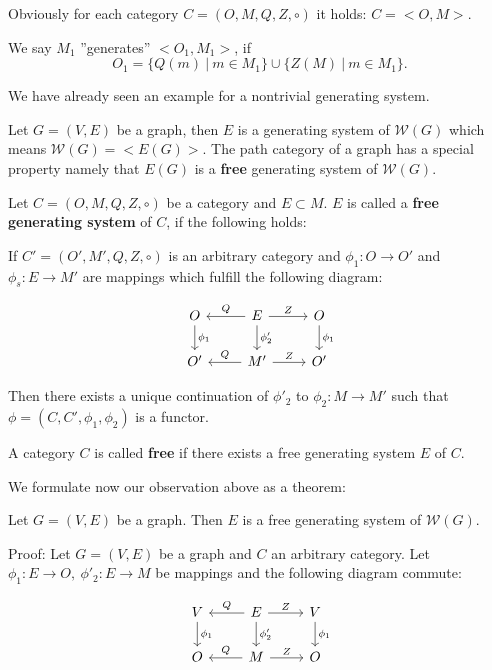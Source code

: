 Obviously for each category $C = (O, M, Q, Z, \circ)$ it holds: $C = {<}O,
M{}>$.

We say $M_1$ ''generates'' ${<}O_1, M_1{>}$, if \[ O_1 = \{ Q(m)\ |\ m \in M_1
\} \cup \{ Z(M)\ |\ m \in M_1 \}. \]

We have already seen an example for a nontrivial generating system.

Let $G = (V,E)$ be a graph, then $E$ is a generating system of $\mathcal{W}(G)$
which means $\mathcal{W}(G) = {<}E(G){>}$. The path category of a graph has a
special property namely that $E(G)$ is a {\bf free} generating system of
$\mathcal{W}(G)$.

\begin{definition}
Let $C = (O, M, Q, Z, \circ)$ be a category and $E \subset M$. $E$ is called a
{\bf free generating system} of $C$, if the following holds:

If $C' = (O', M', Q, Z, \circ)$ is an arbitrary category and $\phi_1 : O \to O'$
and $\phi_s : E \to M'$ are mappings which fulfill the following diagram:

\[
\begin{tikzcd}
 O \arrow[leftarrow]{r}{Q} \arrow{d}{\phi_1} & E \arrow{r}{Z}
 \arrow{d}{\phi'_2} & O \arrow{d}{\phi_1} \\
 O' \arrow[leftarrow]{r}{Q} & M' \arrow{r}{Z} & O'
\end{tikzcd}
\]

Then there exists a unique continuation of $\phi'_2$ to $\phi_2 : M \to M'$ such
that $\phi = (C, C', \phi_1, \phi_2)$ is a functor.
\end{definition}

\begin{definition}
A category $C$ is called {\bf free} if there exists a free generating system $E$
of $C$.
\end{definition}

We formulate now our observation above as a theorem:

\begin{theorem}
Let $G = (V, E)$ be a graph. Then $E$ is a free generating system of
$\mathcal{W}(G)$.
\end{theorem} 

Proof: Let $G = (V, E)$ be a graph and $C$ an arbitrary category. Let $\phi_1 :
E \to O,\ \phi'_2 : E \to M$ be mappings and the following diagram commute:

\[
\begin{tikzcd}
 V \arrow[leftarrow]{r}{Q} \arrow{d}{\phi_1} & E \arrow{r}{Z}
 \arrow{d}{\phi'_2} & V \arrow{d}{\phi_1} \\
 O \arrow[leftarrow]{r}{Q} & M \arrow{r}{Z} & O
\end{tikzcd}
\]

